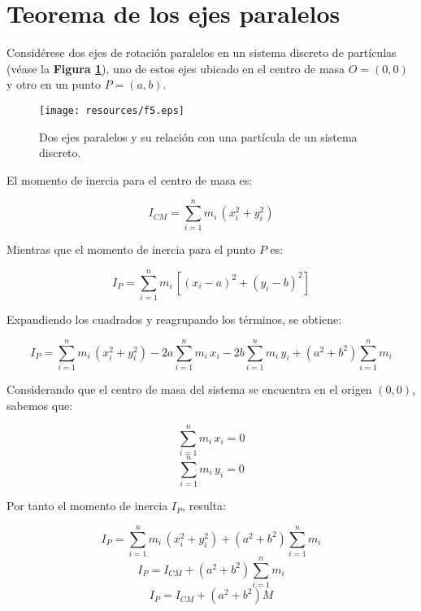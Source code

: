 \documentclass[letter,oneside,11pt]{article}
\begin{document}
\section{Teorema de los ejes paralelos \cite{Sears}}

Considérese dos ejes de rotación paralelos en un sistema discreto de partículas
(véase la \textbf{Figura \ref{figura5}}), uno de estos ejes ubicado en el centro
de masa $O = (0,0)$ y otro en un punto $P = (a,b)$.

\begin{figure}
\centering
\texttt{[image: resources/f5.eps]}
\caption{Dos ejes paralelos y su relación con una partícula de un sistema discreto.}
\label{figura5}
\end{figure}

El momento de inercia para el centro de masa es:

\begin{equation*}
    I_{CM} = \sum_{i=1}^{n} m_i\, (x^2_i + y^2_i)
\end{equation*}

Mientras que el momento de inercia  para el punto $P$ es:

\begin{equation*}
    I_{P} = \sum_{i=1}^{n} m_i\, [ (x_i-a)^2 + (y_i-b)^2 ]
\end{equation*}

Expandiendo los cuadrados y reagrupando los términos, se obtiene:

\begin{equation*}
    I_{P} = \sum_{i=1}^{n} m_i\, (x^2_i + y^2_i) - 2a \sum_{i=1}^{n} m_i\, x_i - 2b \sum_{i=1}^{n} m_i\, y_i + (a^2 + b^2) \sum_{i=1}^{n} m_i
\end{equation*}

Considerando que el centro de masa del sistema se encuentra en el origen
$(0,0)$, sabemos que:

\begin{equation*}
    \sum_{i=1}^{n} m_i\, x_i = 0
\end{equation*}
\begin{equation*}
    \sum_{i=1}^{n} m_i\, y_i = 0
\end{equation*}

Por tanto el momento de inercia $I_P$, resulta:

\begin{equation*}
    I_{P} = \sum_{i=1}^{n} m_i\, (x^2_i + y^2_i) + (a^2 + b^2) \sum_{i=1}^{n} m_i
\end{equation*}
\begin{equation*}
    I_{P} = I_{CM} + (a^2 + b^2) \sum_{i=1}^{n} m_i
\end{equation*}
\begin{equation*}
    I_{P} = I_{CM} + (a^2 + b^2) M
\end{equation*}
\end{document}
